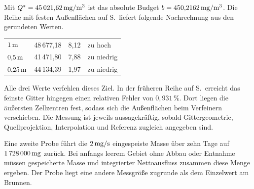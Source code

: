 Mit \(Q^*=45\,021{,}62\,\mathrm{mg/m^3}\) ist das absolute Budget \(b=450{,}2162\,\mathrm{mg/m^3}\). Die Reihe mit festen Außenflächen auf S.\, liefert folgende Nachrechnung aus den gerundeten Werten.
{\tblstart\begin{tabularx}{\linewidth}{@{}lrrY@{}}\toprule
{}&&&\\\midrule
\(1\,\mathrm{m}\)&48\,677,18&8,12&zu hoch\\
\(0{,}5\,\mathrm{m}\)&41\,471,80&7,88&zu niedrig\\
\(0{,}25\,\mathrm{m}\)&44\,134,39&1,97&zu niedrig\\\bottomrule\end{tabularx}\par}
Alle drei Werte verfehlen dieses Ziel. In der früheren Reihe auf S.\, erreicht das feinste Gitter hingegen einen relativen Fehler von \(0{,}931\,\%\). Dort liegen die äußersten Zellzentren fest, sodass sich die Außenflächen beim Verfeinern verschieben. Die Messung ist jeweils aussagekräftig, sobald Gittergeometrie, Quellprojektion, Interpolation und Referenz zugleich angegeben sind.

Eine zweite Probe führt die \(2\,\mathrm{mg/s}\) eingespeiste Masse über zehn Tage auf \(1\,728\,000\,\mathrm{mg}\) zurück. Bei anfangs leerem Gebiet ohne Abbau oder Entnahme müssen gespeicherte Masse und integrierter Nettoausfluss zusammen diese Menge ergeben. Der Probe liegt eine andere Messgröße zugrunde als dem Einzelwert am Brunnen.



